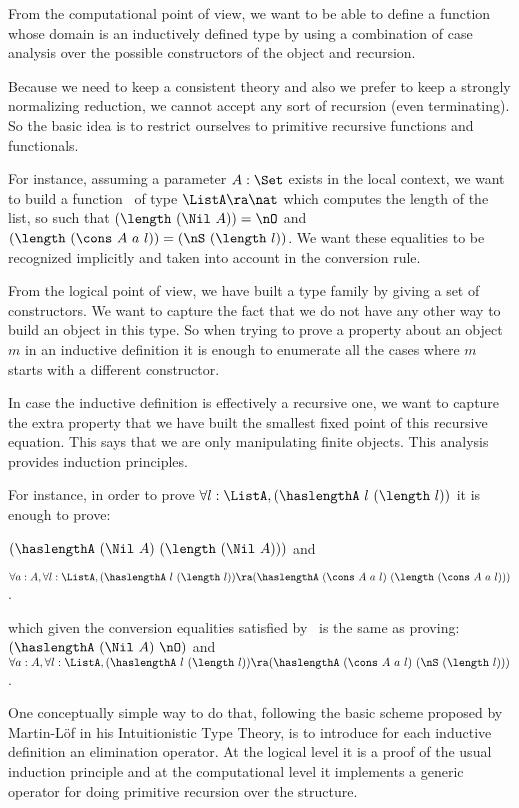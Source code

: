 From the computational point of view, we want to be able to define a
function whose domain is an inductively defined type by using a
combination of case analysis over the possible constructors of the
object and recursion.

Because we need to keep a consistent theory and also we prefer to keep
a strongly normalizing reduction, we cannot accept any sort of
recursion (even terminating). So the basic idea is to restrict
ourselves to primitive recursive functions and functionals.

For instance, assuming a parameter $A:\Set$ exists in the local context, we
want to build a function \length\ of type $\ListA\ra \nat$ which
computes the length of the list, so such that $(\length~(\Nil~A)) = \nO$
and $(\length~(\cons~A~a~l)) = (\nS~(\length~l))$.  We want these
equalities to be recognized implicitly and taken into account in the
conversion rule.

From the logical point of view, we have built a type family by giving
a set of constructors.  We want to capture the fact that we do not
have any other way to build an object in this type. So when trying to
prove a property about an object $m$ in an inductive definition it is
enough to enumerate all the cases where $m$ starts with a different
constructor.

In case the inductive definition is effectively a recursive one, we
want to capture the extra property that we have built the smallest
fixed point of this recursive equation.  This says that we are only
manipulating finite objects. This analysis provides induction
principles.

For instance, in order to prove $\forall l:\ListA,(\haslengthA~l~(\length~l))$
it is enough to prove:

\noindent $(\haslengthA~(\Nil~A)~(\length~(\Nil~A)))$ and

\smallskip
$\forall a:A, \forall l:\ListA, (\haslengthA~l~(\length~l)) \ra
(\haslengthA~(\cons~A~a~l)~(\length~(\cons~A~a~l)))$.
\smallskip

\noindent which given the conversion equalities satisfied by \length\ is the
same as proving:
$(\haslengthA~(\Nil~A)~\nO)$ and $\forall a:A, \forall l:\ListA, 
(\haslengthA~l~(\length~l)) \ra
(\haslengthA~(\cons~A~a~l)~(\nS~(\length~l)))$.

One conceptually simple way to do that, following the basic scheme
proposed by Martin-L\"of in his Intuitionistic Type Theory, is to
introduce for each inductive definition an elimination operator. At
the logical level it is a proof of the usual induction principle and
at the computational level it implements a generic operator for doing
primitive recursion over the structure.

